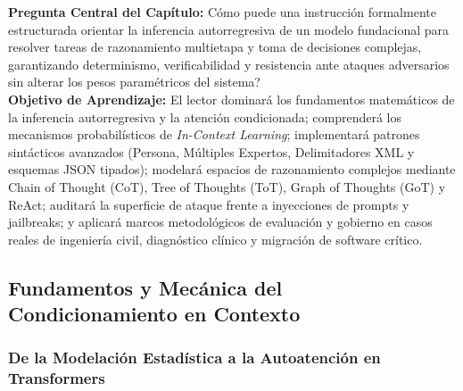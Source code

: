 \begin{cajabeige}
\textbf{Pregunta Central del Capítulo:} \textquestiondown Cómo puede una instrucción formalmente estructurada orientar la inferencia autorregresiva de un modelo fundacional para resolver tareas de razonamiento multietapa y toma de decisiones complejas, garantizando determinismo, verificabilidad y resistencia ante ataques adversarios sin alterar los pesos paramétricos del sistema?\\[0.3cm]
\textbf{Objetivo de Aprendizaje:} El lector dominará los fundamentos matemáticos de la inferencia autorregresiva y la atención condicionada; comprenderá los mecanismos probabilísticos de \textit{In-Context Learning}; implementará patrones sintácticos avanzados (Persona, Múltiples Expertos, Delimitadores XML y esquemas JSON tipados); modelará espacios de razonamiento complejos mediante Chain of Thought (CoT), Tree of Thoughts (ToT), Graph of Thoughts (GoT) y ReAct; auditará la superficie de ataque frente a inyecciones de prompts y jailbreaks; y aplicará marcos metodológicos de evaluación y gobierno en casos reales de ingeniería civil, diagnóstico clínico y migración de software crítico.
\end{cajabeige}


\vspace{0.4cm}

\subsection{Fundamentos y Mecánica del Condicionamiento en Contexto}

\subsubsection{De la Modelación Estadística a la Autoatención en Transformers}

